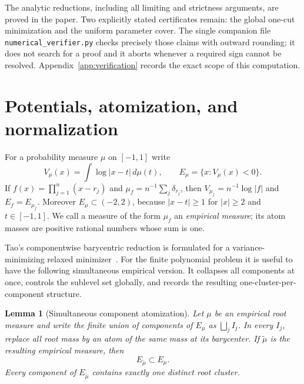 \documentclass[11pt]{article}
\numberwithin{equation}{section}
\theoremstyle{plain}
\newtheorem{lemma}[theorem]{Lemma}
\theoremstyle{definition}
\theoremstyle{remark}
\newcommand{\1}{\mathbf 1}
\newcommand{\dd}{\,d}
\begin{document}
The analytic reductions, including all limiting and strictness arguments,
are proved in the paper.  Two explicitly stated certificates remain: the
global one-cut minimization and the uniform parameter cover.  The single companion file
\texttt{numerical\_verifier.py} checks precisely those claims with outward
rounding; it does not search for a proof and it aborts whenever a required
sign cannot be resolved.  Appendix~\ref{app:verification} records the exact
scope of this computation.

\section{Potentials, atomization, and normalization}\label{sec:reduction}

For a probability measure $\mu$ on $[-1,1]$ write
\[
 V_\mu(x)=\int\log|x-t|\dd\mu(t),\qquad
 E_\mu=\{x:V_\mu(x)<0\}.
\]
If $f(x)=\prod_{j=1}^n(x-r_j)$ and
$\mu_f=n^{-1}\sum_j\delta_{r_j}$, then
$V_{\mu_f}=n^{-1}\log|f|$ and $E_f=E_{\mu_f}$.  Moreover
$E_\mu\subset(-2,2)$, because $|x-t|\ge1$ for $|x|\ge2$ and
$t\in[-1,1]$.  We call a measure of the form $\mu_f$ an
\emph{empirical measure}; its atom masses are positive rational numbers
whose sum is one.

Tao's componentwise barycentric reduction is formulated for a
variance-minimizing relaxed minimizer~\cite[Section~3]{Tao1038Updated}.
For the finite polynomial problem it is useful to have the following
simultaneous empirical version.  It collapses all components at once,
controls the sublevel set globally, and records the resulting
one-cluster-per-component structure.

\begin{lemma}[Simultaneous component atomization]\label{lem:atomize}
Let $\mu$ be an empirical root measure and write the finite union of
components of $E_\mu$ as $\bigsqcup_j I_j$.  In every $I_j$, replace all
root mass by an atom of the same mass at its barycenter.  If $\widetilde
\mu$ is the resulting empirical measure, then
\[
 E_{\widetilde\mu}\subset E_\mu.
\]
Every component of $E_{\widetilde\mu}$ contains exactly one distinct root
cluster.
\end{lemma}
\end{document}
